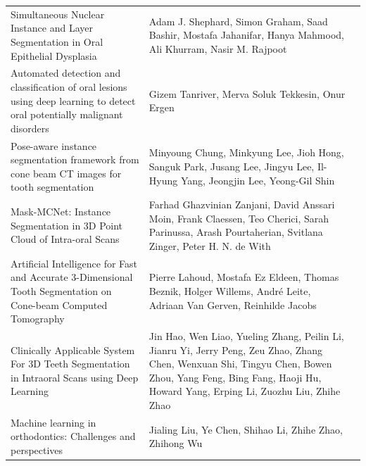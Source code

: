 \begin{table}[H]
{\begin{tabular}{l|l|l}
        Simultaneous Nuclear Instance and Layer Segmentation in Oral Epithelial Dysplasia                                               & Adam J. Shephard, Simon Graham, Saad Bashir, Mostafa Jahanifar, Hanya Mahmood, Ali Khurram, Nasir M. Rajpoot                                                                                                          &  \cite{Shephard2021}    \\
        Automated detection and classification of oral lesions using deep learning to detect oral potentially malignant disorders       & Gizem Tanriver, Merva Soluk Tekkesin, Onur Ergen                                                                                                                                                                      &  \cite{Tanriver2021}    \\
        Pose-aware instance segmentation framework from cone beam CT images for tooth segmentation                                      & Minyoung Chung, Minkyung Lee, Jioh Hong, Sanguk Park, Jusang Lee, Jingyu Lee, Il-Hyung Yang, Jeongjin Lee, Yeong-Gil Shin                                                                                             &  \cite{Minyoung2020}    \\
        Mask-MCNet: Instance Segmentation in 3D Point Cloud of Intra-oral Scans                                                         & Farhad Ghazvinian Zanjani, David Anssari Moin, Frank Claessen, Teo Cherici, Sarah Parinussa, Arash Pourtaherian, Svitlana Zinger, Peter H. N. de With                                                                 &  \cite{Ghazvinian2021}  \\
        Artificial Intelligence for Fast and Accurate 3-Dimensional Tooth Segmentation on Cone-beam Computed Tomography                 & Pierre Lahoud, Mostafa Ez Eldeen, Thomas Beznik, Holger Willems, André Leite, Adriaan Van Gerven, Reinhilde Jacobs                                                                                                    &  \cite{Lahoud2021}      \\
        Clinically Applicable System For 3D Teeth Segmentation in Intraoral Scans using Deep Learning                                   & Jin Hao, Wen Liao, Yueling Zhang, Peilin Li, Jianru Yi, Jerry Peng, Zeu Zhao, Zhang Chen, Wenxuan Shi, Tingyu Chen, Bowen Zhou, Yang Feng, Bing Fang, Haoji Hu, Howard Yang, Erping Li, Zuozhu Liu, Zhihe Zhao        &  \cite{Hao2020}         \\
        Machine learning in orthodontics: Challenges and perspectives                                                                   & Jialing Liu, Ye Chen, Shihao Li, Zhihe Zhao, Zhihong Wu                                                                                                                                                               &  \cite{Liu2021}         \\

\end{tabular}}
\end{table}
